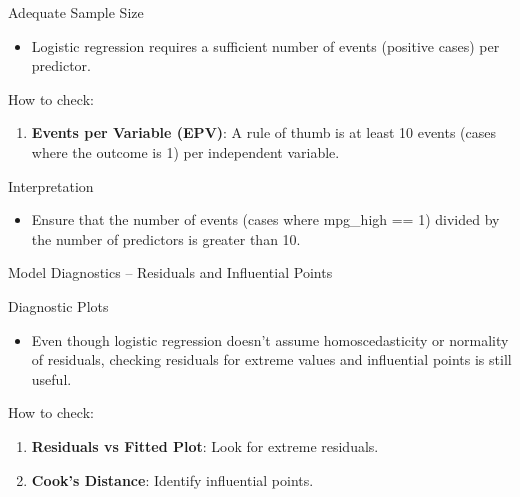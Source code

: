 \documentclass[
  18 pt,
  ignorenonframetext,
  aspectratio=1610,
]{beamer}
\newenvironment{Shaded}{\begin{snugshade}}{\end{snugshade}}
\newcommand{\CommentTok}[1]{\textcolor[rgb]{0.37,0.37,0.37}{#1}}
\newcommand{\FunctionTok}[1]{\textcolor[rgb]{0.28,0.35,0.67}{#1}}
\newcommand{\NormalTok}[1]{\textcolor[rgb]{0.00,0.23,0.31}{#1}}
\newcommand{\SpecialCharTok}[1]{\textcolor[rgb]{0.37,0.37,0.37}{#1}}
\providecommand{\tightlist}{%
  \setlength{\itemsep}{0pt}\setlength{\parskip}{0pt}}\usepackage{longtable,booktabs,array}
\begin{document}
\begin{frame}[fragile]{Adequate Sample Size}
\protect\hypertarget{adequate-sample-size}{}
\begin{itemize}
\tightlist
\item
  Logistic regression requires a sufficient number of events (positive
  cases) per predictor.
\end{itemize}

\begin{block}{How to check:}
\protect\hypertarget{how-to-check-7}{}
\begin{enumerate}
\tightlist
\item
  \textbf{Events per Variable (EPV)}: A rule of thumb is at least 10
  events (cases where the outcome is 1) per independent variable.
\end{enumerate}

\begin{Shaded}
\end{Shaded}
\end{block}

\begin{block}{Interpretation}
\protect\hypertarget{interpretation-11}{}
\begin{itemize}
\tightlist
\item
  Ensure that the number of events (cases where mpg\_high == 1) divided
  by the number of predictors is greater than 10.
\end{itemize}
\end{block}
\end{frame}

\begin{frame}{Model Diagnostics -- Residuals and Influential Points}
\protect\hypertarget{model-diagnostics-residuals-and-influential-points}{}
\begin{block}{Diagnostic Plots}
\protect\hypertarget{diagnostic-plots}{}
\begin{itemize}
\tightlist
\item
  Even though logistic regression doesn't assume homoscedasticity or
  normality of residuals, checking residuals for extreme values and
  influential points is still useful.
\end{itemize}
\end{block}

\begin{block}{How to check:}
\protect\hypertarget{how-to-check-8}{}
\begin{enumerate}
\tightlist
\item
  \textbf{Residuals vs Fitted Plot}: Look for extreme residuals.
\item
  \textbf{Cook's Distance}: Identify influential points.
\end{enumerate}
\end{block}
\end{frame}
\end{document}
